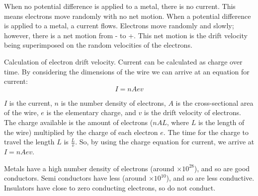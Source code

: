 \documentclass[11pt]{article}
\begin{document}
When no potential difference is applied to a metal, there is no current. This means electrons move randomly with no net motion. When a potential difference is applied to a metal, a current flows. Electrons move randomly and slowly; however, there is a net motion from - to +. This net motion is the drift velocity being superimposed on the random velocities of the electrons.

\begin{define}
	Calculation of electron drift velocity. Current can be calculated as charge over time. By considering the dimensions of the wire we can arrive at an equation for current:
	\[I=nAev\]
\end{define}
$I$ is the current, $n$ is the number density of electrons, $A$ is the cross-sectional area of the wire, $e$ is the elementary charge, and $v$ is the drift velocity of electrons. The charge available is the amount of electrons ($nAL$, where $L$ is the length of the wire) multiplied by the charge of each electron $e$. The time for the charge to travel the length $L$ is $\frac{L}{v}$. So, by using the charge equation for current, we arrive at $I=nAev$.

Metals have a high number density of electrons (around $\times 10^28$), and so are good conductors. Semi conductors have less (around $\times 10^10$), and so are less conductive. Insulators have close to zero conducting electrons, so do not conduct.
\end{document}
